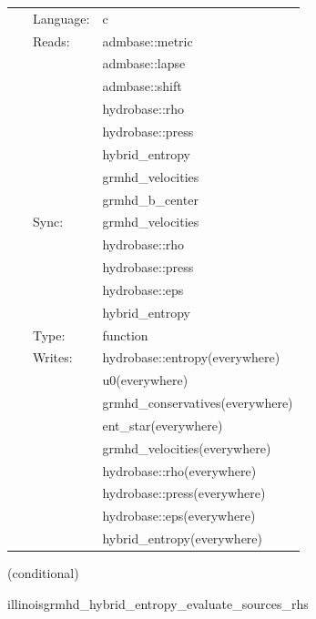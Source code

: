  \begin{tabular*}{160mm}{cll} 
~ & Language:  & c \\ 
~ & Reads:  & admbase::metric \\ 
~& ~ &admbase::lapse\\ 
~& ~ &admbase::shift\\ 
~& ~ &hydrobase::rho\\ 
~& ~ &hydrobase::press\\ 
~& ~ &hybrid\_entropy\\ 
~& ~ &grmhd\_velocities\\ 
~& ~ &grmhd\_b\_center\\ 
~ & Sync:  & grmhd\_velocities \\ 
~& ~ &hydrobase::rho\\ 
~& ~ &hydrobase::press\\ 
~& ~ &hydrobase::eps\\ 
~& ~ &hybrid\_entropy\\ 
~ & Type:  & function \\ 
~ & Writes:  & hydrobase::entropy(everywhere) \\ 
~& ~ &u0(everywhere)\\ 
~& ~ &grmhd\_conservatives(everywhere)\\ 
~& ~ &ent\_star(everywhere)\\ 
~& ~ &grmhd\_velocities(everywhere)\\ 
~& ~ &hydrobase::rho(everywhere)\\ 
~& ~ &hydrobase::press(everywhere)\\ 
~& ~ &hydrobase::eps(everywhere)\\ 
~& ~ &hybrid\_entropy(everywhere)\\ 
\end{tabular*} 


\vspace{5mm}

   (conditional) 

\hspace{5mm} illinoisgrmhd\_hybrid\_entropy\_evaluate\_sources\_rhs 

\hspace{5mm}{\it entropy+hybrid version of illinoisgrmhd\_evaluate\_sources\_rhs } 


\hspace{5mm}

